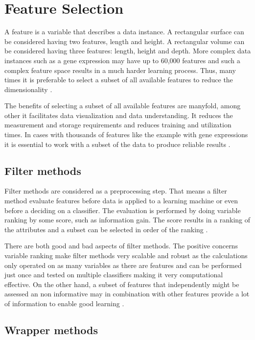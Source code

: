 \section{Feature Selection}

A feature is a variable that describes a data instance. A rectangular surface can be considered having two features, length and height. A rectangular volume can be considered having three features: length, height and depth. More complex data instances such as a gene expression may have up to 60,000 features and such a complex feature space results in a much harder learning process. Thus, many times it is preferable to select a subset of all available features to reduce the dimensionality \parencite{guyon2003}.

The benefits of selecting a subset of all available features are manyfold, among other it facilitates data visualization and data understanding. It reduces the measurement and storage requirements and reduces training and utilization times. In cases with thousands of features like the example with gene expressions it is essential to work with a subset of the data to produce reliable results \parencite{guyon2003}.


\subsection{Filter methods}

Filter methods are considered as a preprocessing step. That means a filter method evaluate features before data is applied to a learning machine or even before a deciding on a classifier. The evaluation is performed by doing variable ranking by some score, such as information gain. The score results in a ranking of the attributes and a subset can be selected in order of the ranking \parencite{guyon2003}.

There are both good and bad aspects of filter methods. The positive concerns variable ranking make filter methods very scalable and robust as the calculations only operated on as many variables as there are features and can be performed just once and tested on multiple classifiers making it very computational effective. On the other hand, a subset of features that independently might be assessed an non informative may in combination with other features provide a lot of information to enable good learning \parencite{guyon2003}.


\subsection{Wrapper methods}

